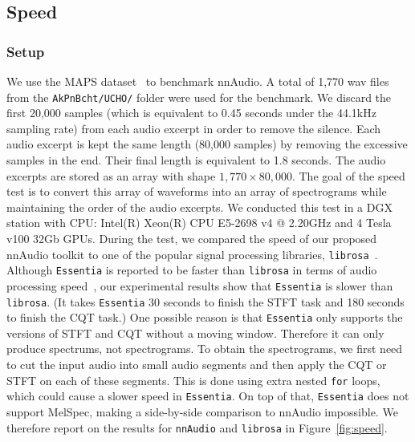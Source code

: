 \documentclass{ieeeaccess}
\newcommand{\nbh}[1]{\texttt{#1}}
\begin{document}
\subsection{Speed}\label{subsec: speed}

\subsubsection{Setup}
We use the MAPS dataset~\cite{emiya2010maps} to benchmark nnAudio. A total of 1,770 wav files from the \nbh{AkPnBcht/UCHO/} folder were used for the benchmark. We discard the first 20,000 samples (which is equivalent to 0.45 seconds under the 44.1kHz sampling rate) from each audio excerpt in order to remove the silence. Each audio excerpt is kept the same length (80,000 samples) by removing the excessive samples in the end. Their final length is equivalent to 1.8 seconds. The audio excerpts are stored as an array with shape $1,770 \times 80,000$. The goal of the speed test is to convert this array of waveforms into an array of spectrograms while maintaining the order of the audio excerpts. We conducted this test in a DGX station with CPU: Intel(R) Xeon(R) CPU E5-2698 v4 @ 2.20GHz and 4 Tesla v100 32Gb GPUs. During the test, we compared the speed of our proposed nnAudio toolkit to one of the popular signal processing libraries, \nbh{librosa}~\cite{mcfee2015Librosa}. Although \nbh{Essentia} is reported to be faster than \nbh{librosa} in terms of audio processing speed~\cite{moffat2015evaluation}, our experimental results show that \nbh{Essentia} is slower than \nbh{librosa}. (It takes \nbh{Essentia} 30 seconds to finish the STFT task and 180 seconds to finish the CQT task.) One possible reason is that \nbh{Essentia} only supports the versions of STFT and CQT without a moving window. Therefore it can only produce spectrums, not spectrograms. To obtain the spectrograms, we first need to cut the input audio into small audio segments and then apply the CQT or STFT on each of these segments. This is done using extra nested \nbh{for} loops, which could cause a slower speed in \nbh{Essentia}. On top of that, \nbh{Essentia} does not support MelSpec, making a side-by-side comparison to nnAudio impossible. We therefore report on the results for \nbh{nnAudio} and \nbh{librosa} in Figure~\ref{fig:speed}.
\end{document}
